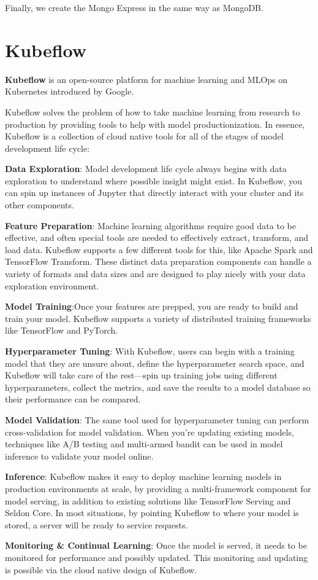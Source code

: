 Finally, we create the Mongo Express in the same way as MongoDB.

\section{Kubeflow}

\bd[Kubeflow]
\textbf{Kubeflow} is an open-source platform for machine learning and MLOps on Kubernetes introduced by Google.
\ed

Kubeflow solves the problem of how to take machine learning from research to production by providing tools to help
with model productionization. In essence, Kubeflow is a collection of cloud native tools for all of the stages of
model development life cycle:
\bit
\item \textbf{Data Exploration}: Model development life cycle always begins with data exploration to understand where
possible insight might exist. In Kubeflow, you can spin up instances of Jupyter that directly interact with your
cluster and its other components.
\item \textbf{Feature Preparation}: Machine learning algorithms require good data to be effective, and often special
tools are needed to effectively extract, transform, and load data. Kubeflow supports a few different tools for this,
like Apache Spark and TensorFlow Transform. These distinct data preparation components can handle a variety of
formats and data sizes and are designed to play nicely with your data exploration environment.
\item \textbf{Model Training}:Once your features are prepped, you are ready to build and train your model. Kubeflow
supports a variety of distributed training frameworks like TensorFlow and PyTorch.
\item \textbf{Hyperparameter Tuning}: With Kubeflow, users can begin with a training model that they are unsure about,
define the hyperparameter search space, and Kubeflow will take care of the rest—spin up training jobs using different
hyperparameters, collect the metrics, and save the results to a model database so their performance can be compared.
\item \textbf{Model Validation}: The same tool used for hyperparameter tuning can perform cross-validation for model
validation. When you’re updating existing models, techniques like A/B testing and multi-armed bandit can be used in
model inference to validate your model online.
\item \textbf{Inference}: Kubeflow makes it easy to deploy machine learning models in production environments at
scale, by providing a multi-framework component for model serving, in addition to existing solutions like TensorFlow
Serving and Seldon Core. In most situations, by pointing Kubeflow to where your model is stored, a server will be
ready to service requests.
\item \textbf{Monitoring \& Continual Learning}: Once the model is served, it needs to be monitored for performance
and possibly updated. This monitoring and updating is possible via the cloud native design of Kubeflow.
\eit

